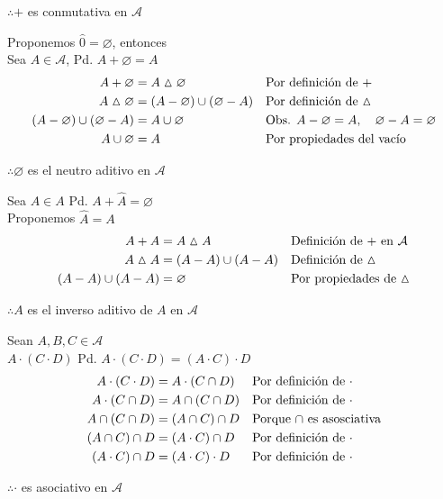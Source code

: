 \documentclass[letterpaper]{article}
\newcommand{\A}{\mathcal{A}}
\newcommand{\dsim}{\vartriangle}
\renewcommand{\*}{\cdot}
\theoremstyle{definition}
\begin{document}
\begin{center}
	$ \therefore + $ es conmutativa en $ \A $
\end{center}
Proponemos $ \hat{0} = \varnothing $, entonces\\
Sea $ A \in \A $, Pd. $ A + \varnothing = A $
\begin{align*}
	A + \varnothing &= A \dsim \varnothing && \text{Por definición de +}\\
	A \dsim \varnothing &= (A - \varnothing) \cup(\varnothing - A) && \text{Por definición de $ \dsim $}\\
	(A - \varnothing) \cup(\varnothing - A) &= A \cup \varnothing && \text{Obs. $ A - \varnothing = A,\quad \varnothing - A = \varnothing $}\\
	A \cup \varnothing &= A && \text{Por propiedades del vacío}
\end{align*}
\begin{center}
	$ \therefore \varnothing $ es el neutro aditivo en $ \A $
\end{center}
Sea $ A \in A $ Pd. $ A + \hat{A} = \varnothing $\\
Proponemos $ \hat{A} = A $
\begin{align*}
	A + A &= A\dsim A && \text{Definición de + en $ \A $}\\
	A \dsim A &= (A- A)\cup(A-A) && \text{Definición de $ \dsim $}\\
	(A- A)\cup(A-A) &= \varnothing && \text{Por propiedades de  $ \dsim $}\\
\end{align*}
\begin{center}
	$ \therefore A $ es el inverso aditivo de $ A $ en $ \A $
\end{center}
Sean $ A,B,C \in \A$\\
$ A \*( C \* D ) $ Pd. $  A \*( C \* D ) = (A \* C) \* D $
\begin{align*}
	A\*(C\*D) &= A\*(C \cap D) && \text{Por definición de $ \* $}\\
	A\*(C \cap D) &= A\cap(C \cap D) && \text{Por definición de $ \* $}\\
	A\cap(C \cap D) &= (A\cap C)\cap D && \text{Porque $ \cap $ es asosciativa}\\
	(A\cap C)\cap D &= (A \* C) \cap D && \text{Por definición de $ \* $}\\
	(A \* C) \cap D &= (A \* C)\* D  && \text{Por definición de $ \* $}\\
\end{align*}
\begin{center}
	$ \therefore \* $ es asociativo en $ \A $
\end{center}
\end{document}

